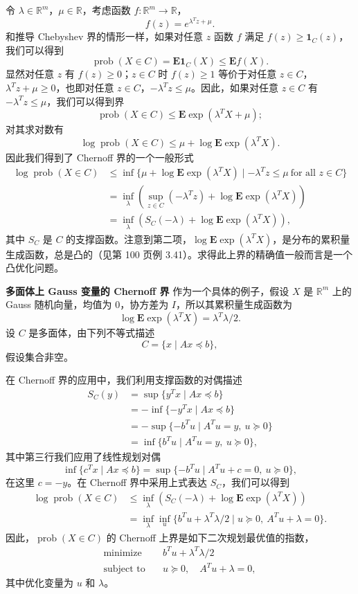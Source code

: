 \documentclass[UTF8,12pt,a4paper,fontset=fandol]{ctexart}
\begin{document}
令 $\lambda\in\mathbb{R}^m$，$\mu\in\mathbb{R}$，考虑函数 $f:\mathbb{R}^m\to\mathbb{R}$，
\[
f(z)=e^{\lambda^Tz+\mu}.
\]
和推导 Chebyshev 界的情形一样，如果对任意 $z$ 函数 $f$ 满足 $f(z)\geq\mathbf{1}_C(z)$，我们可以得到
\[
\operatorname{prob}(X\in C)=\mathbf{E}\mathbf{1}_C(X)\leq \mathbf{E}f(X).
\]
显然对任意 $z$ 有 $f(z)\geq 0$；$z\in C$ 时 $f(z)\geq 1$ 等价于对任意 $z\in C$，$\lambda^Tz+\mu\geq 0$，也即对任意 $z\in C$，$-\lambda^Tz\leq \mu$。因此，如果对任意 $z\in C$ 有 $-\lambda^Tz\leq \mu$，我们可以得到界
\[
\operatorname{prob}(X\in C)\leq \mathbf{E}\exp(\lambda^TX+\mu);
\]
对其求对数有
\[
\log\operatorname{prob}(X\in C)\leq \mu+\log\mathbf{E}\exp(\lambda^TX).
\]
因此我们得到了 Chernoff 界的一个一般形式
\[
\begin{aligned}
\log\operatorname{prob}(X\in C)
&\leq \inf\{\mu+\log\mathbf{E}\exp(\lambda^TX)\mid -\lambda^Tz\leq\mu\ \text{for all }z\in C\}\\
&=\inf_\lambda\left(\sup_{z\in C}(-\lambda^Tz)+\log\mathbf{E}\exp(\lambda^TX)\right)\\
&=\inf_\lambda\left(S_C(-\lambda)+\log\mathbf{E}\exp(\lambda^TX)\right),
\end{aligned}
\]
其中 $S_C$ 是 $C$ 的支撑函数。注意到第二项，$\log\mathbf{E}\exp(\lambda^TX)$，是分布的累积量生成函数，总是凸的（见第 100 页例 3.41）。求得此上界的精确值一般而言是一个凸优化问题。

\noindent\textbf{多面体上 Gauss 变量的 Chernoff 界}\quad
作为一个具体的例子，假设 $X$ 是 $\mathbb{R}^m$ 上的 Gauss 随机向量，均值为 $0$，协方差为 $I$，所以其累积量生成函数为
\[
\log\mathbf{E}\exp(\lambda^TX)=\lambda^T\lambda/2.
\]
设 $C$ 是多面体，由下列不等式描述
\[
C=\{x\mid Ax\preceq b\},
\]
假设集合非空。

在 Chernoff 界的应用中，我们利用支撑函数的对偶描述
\[
\begin{aligned}
S_C(y)&=\sup\{y^Tx\mid Ax\preceq b\}\\
&=-\inf\{-y^Tx\mid Ax\preceq b\}\\
&=-\sup\{-b^Tu\mid A^Tu=y,\ u\succeq 0\}\\
&=\inf\{b^Tu\mid A^Tu=y,\ u\succeq 0\},
\end{aligned}
\]
其中第三行我们应用了线性规划对偶
\[
\inf\{c^Tx\mid Ax\preceq b\}=\sup\{-b^Tu\mid A^Tu+c=0,\ u\succeq 0\},
\]
在这里 $c=-y$。在 Chernoff 界中采用上式表达 $S_C$，我们可以得到
\[
\begin{aligned}
\log\operatorname{prob}(X\in C)
&\leq \inf_\lambda\left(S_C(-\lambda)+\log\mathbf{E}\exp(\lambda^TX)\right)\\
&=\inf_\lambda\inf_u\{b^Tu+\lambda^T\lambda/2\mid u\succeq 0,\ A^Tu+\lambda=0\}.
\end{aligned}
\]
因此，$\operatorname{prob}(X\in C)$ 的 Chernoff 上界是如下二次规划最优值的指数，
\begin{equation}
\begin{aligned}
\text{minimize}\quad & b^Tu+\lambda^T\lambda/2\\
\text{subject to}\quad & u\succeq 0,\quad A^Tu+\lambda=0,
\end{aligned}
\tag{7.21}
\end{equation}
其中优化变量为 $u$ 和 $\lambda$。
\end{document}
